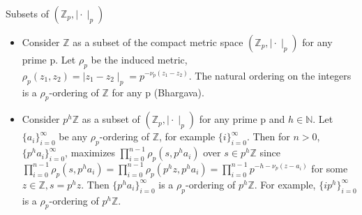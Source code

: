 \begin{example}
	Subsets of $(\mathbb{Z}_p, \mid \cdot \mid_p)$
	\begin{itemize}
		\item  Consider $\mathbb{Z}$ as a subset of the compact metric space $(\mathbb{Z}_p, \mid \cdot \mid_p)$ for any prime p. Let $\rho_p$ be the induced metric, $\rho_p(z_1, z_2) = \mid z_1 - z_2 \mid_p = p^{-\nu_p(z_1-z_2)}$. The natural ordering on the integers is a $\rho_p$-ordering of $\mathbb{Z}$ for any p (Bhargava).
		
		\item 	Consider $p^h\mathbb{Z}$ as a subset of $(\mathbb{Z}_p, \mid \cdot \mid_p)$ for any prime p and $h \in \mathbb{N}$. Let $\{a_i\}_{i=0}^{\infty}$ be any $\rho_p$-ordering of $\mathbb{Z}$, for example $\{i\}_{i=0}^\infty$. Then for $n>0$, $\{p^ha_i\}_{i=0}^\infty$, maximizes $\prod_{i=0}^{n-1} \rho_p(s,p^ha_i)$ over $s \in p^h\mathbb{Z}$	since $\prod_{i=0}^{n-1} \rho_p(s,p^ha_i) = \prod_{i=0}^{n-1} \rho_p(p^hz,p^ha_i) = \prod_{i=0}^{n-1} p^{-h-\nu_p(z-a_i)}$ for some $z \in \mathbb{Z}, s= p^hz$. Then $\{p^ha_i\}_{i=0}^\infty$ is a $\rho_p$-ordering of $p^h\mathbb{Z}$. For example, $\{ip^h\}_{i=0}^\infty$ is a $\rho_p$-ordering of $p^h\mathbb{Z}$.
	\end{itemize}
\end{example}

